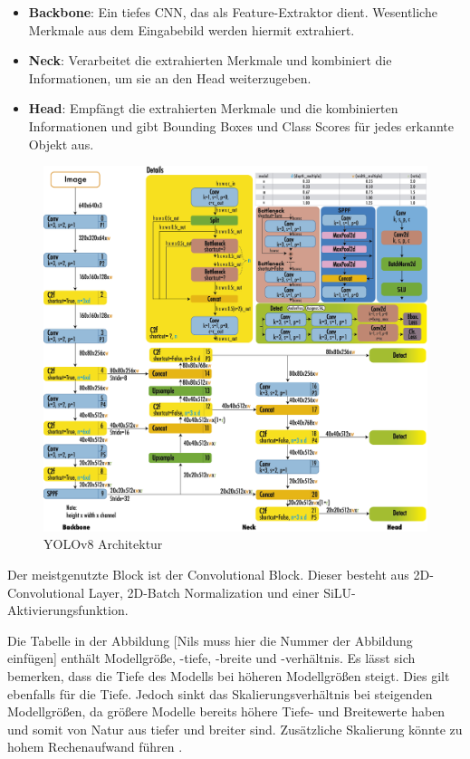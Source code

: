 \documentclass[a4paper,12pt]{article}
\begin{document}
\begin{itemize}
    \item \textbf{Backbone}: Ein tiefes CNN, das als Feature-Extraktor dient. Wesentliche Merkmale aus dem Eingabebild werden hiermit extrahiert.
    \item \textbf{Neck}: Verarbeitet die extrahierten Merkmale und kombiniert die Informationen, um sie an den Head weiterzugeben.
    \item \textbf{Head}: Empfängt die extrahierten Merkmale und die kombinierten Informationen und gibt Bounding Boxes und Class Scores für jedes erkannte Objekt aus.
\end{itemize}

\FloatBarrier
\begin{figure}[h]
    \centering
    \includegraphics[width=\textwidth]{Bild6.png}
    \caption{YOLOv8 Architektur}
    \label{fig:bild6}
\end{figure}
\FloatBarrier

\noindent Der meistgenutzte Block ist der Convolutional Block. Dieser besteht aus 2D-Convolutional Layer, 2D-Batch Normalization und einer SiLU-Aktivierungsfunktion. 

\noindent Die Tabelle in der Abbildung [Nils muss hier die Nummer der Abbildung einfügen] enthält Modellgröße, -tiefe, -breite und -verhältnis. Es lässt sich bemerken, dass die Tiefe des Modells bei höheren Modellgrößen steigt. Dies gilt ebenfalls für die Tiefe. Jedoch sinkt das Skalierungsverhältnis bei steigenden Modellgrößen, da größere Modelle bereits höhere Tiefe- und Breitewerte haben und somit von Natur aus tiefer und breiter sind. Zusätzliche Skalierung könnte zu hohem Rechenaufwand führen \cite{terven2023comprehensive}.

\noindent 

\FloatBarrier

\printbibliography
\end{document}
